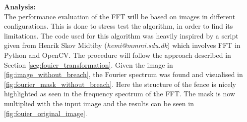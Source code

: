 \documentclass[../Head/Main.tex]{subfiles}
\begin{document}
\textbf{Analysis:}\\
The performance evaluation of the FFT will be based on images in different configurations. This is done to stress test the algorithm, in order to find its limitations. The code used for this algorithm was heavily inspired by a script given from Henrik Skov Midtiby (\textit{hemi@mmmi.sdu.dk}) which involves FFT in Python and OpenCV. The procedure will follow the approach described in Section \ref{seg:fouier_transformation}. Given the image in \autoref{fig:image_without_breach}, the Fourier spectrum was found and visualised in \autoref{fig:fourier_mask_without_breach}. Here the structure of the fence is nicely highlighted as seen in the frequency spectrum of the FFT. The mask is now multiplied with the input image and the results can be seen in \autoref{fig:fouier_original_image}.
\end{document}
